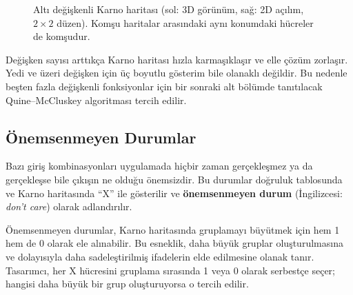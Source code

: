 \begin{figure}[H]
\caption{Altı değişkenli Karno haritası (sol: 3D görünüm, sağ: 2D açılım, $2 \times 2$ düzen). Komşu haritalar arasındaki aynı konumdaki hücreler de komşudur.}
\label{fig:B.karno6}
\end{figure}

Değişken sayısı arttıkça Karno haritası hızla karmaşıklaşır ve elle çözüm zorlaşır. Yedi ve üzeri değişken için üç boyutlu gösterim bile olanaklı değildir. Bu nedenle beşten fazla değişkenli fonksiyonlar için bir sonraki alt bölümde tanıtılacak Quine--McCluskey algoritması tercih edilir.

\subsection{Önemsenmeyen Durumlar}

Bazı giriş kombinasyonları uygulamada hiçbir zaman gerçekleşmez ya da gerçekleşse bile çıkışın ne olduğu önemsizdir. Bu durumlar doğruluk tablosunda ve Karno haritasında ``X'' ile gösterilir ve \textbf{önemsenmeyen durum} (İngilizcesi: \textit{don't care}) olarak adlandırılır.

Önemsenmeyen durumlar, Karno haritasında gruplamayı büyütmek için hem 1 hem de 0 olarak ele alınabilir. Bu esneklik, daha büyük gruplar oluşturulmasına ve dolayısıyla daha sadeleştirilmiş ifadelerin elde edilmesine olanak tanır. Tasarımcı, her X hücresini gruplama sırasında 1 veya 0 olarak serbestçe seçer; hangisi daha büyük bir grup oluşturuyorsa o tercih edilir.

